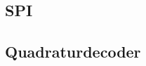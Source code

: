 \documentclass[../../main]{subfiles}
\begin{document}
\subsection{SPI}%
\label{sub:spi}
  

\subsection{Quadraturdecoder}%

\end{document}
